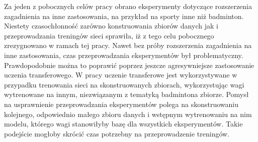 Za jeden z pobocznych celów pracy obrano eksperymenty dotyczące rozszerzenia zagadnienia na inne zastosowania, na przykład na sporty inne niż badminton. Niestety czasochłonność zarówno konstruowania zbiorów danych jak i przeprowadzania treningów sieci sprawiła, iż z tego celu pobocznego zrezygnowano w ramach tej pracy.
Nawet bez próby rozszerzenia zagadnienia na inne zastosowania, czas przeprowadzania eksperymentów był problematyczny. Prawdopodobnie można to poprawić poprzez jeszcze agresywniejsze zastosowanie uczenia transferowego. W pracy uczenie transferowe jest wykorzystywane w przypadku trenowania sieci na skonstruowanych zbiorach, wykorzystując wagi wytrenowane na innym, niezwiązanym z tematyką badmintona zbiorze. Pomysł na usprawnienie przeprowadzania eksperymentów polega na skonstruowaniu kolejnego, odpowiednio małego zbioru danych i wstępnym wytrenowaniu na nim modelu, którego wagi stanowiłyby bazę dla wszystkich eksperymentów. Takie podejście mogłoby skrócić czas potrzebny na przeprowadzenie treningów.
